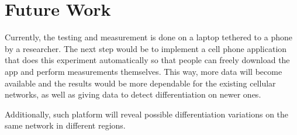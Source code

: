 \documentclass[letterpaper]{sig-alternate-10pt}
\begin{document}
\section{Future Work}

Currently, the testing and measurement is done on a laptop tethered to a phone by a researcher. The next step would be to implement a cell phone application that does this experiment automatically so that people can freely download the app and perform measurements themselves. This way, more data will become available and the results would be more dependable for the existing cellular networks, as well as giving data to detect differentiation on newer ones.

Additionally, such platform will reveal possible differentiation variations on the same network in different regions.

\begin{small}

\end{small}
\end{document}
